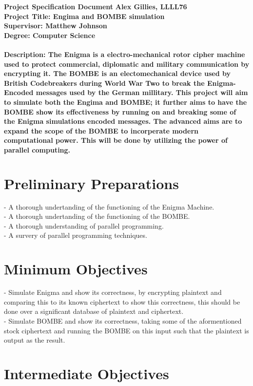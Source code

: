 \documentclass[a4paper, 11pt]{article}
\begin{document}
\noindent
\large\textbf{Project Specification Document} \hfill \textbf{Alex Gillies, LLLL76} \\
\large\textbf{Project Title: Engima and BOMBE simulation} \hfill \\
\large\textbf{Supervisor: Matthew Johnson} \hfill \\
\large\textbf{Degree: Computer Science} \hfill \\
\\
\small\textbf{Description: The Enigma is a electro-mechanical rotor cipher machine used to protect commercial, diplomatic and military communication by encrypting it. The BOMBE is an electomechanical device used by British Codebreakers during World War Two to break the Enigma-Encoded messages used by the German millitary. This project will aim to simulate both the Engima and BOMBE; it further aims to have the BOMBE show its effectiveness by running on and breaking some of the Enigma simulations encoded messages. The advanced aims are to expand the scope of the BOMBE to incorperate modern computational power. This will be done by utilizing the power of parallel computing.} \hfill 


\section*{Preliminary Preparations}

- A thorough undertanding of the functioning of the Enigma Machine.\\
- A thorough undertanding of the functioning of the BOMBE.\\
- A thorough understanding of parallel programming.\\
- A survery of parallel programming techniques.

\section*{Minimum Objectives}

- Simulate Enigma and show its correctness, by encrypting plaintext and comparing this to its known ciphertext to show this correctness, this should be done over a significant database of plaintext and ciphertext.\\
- Simulate BOMBE and show its correctness, taking some of the aformentioned stock ciphertext and running the BOMBE on this input such that the plaintext is output as the result.

\section*{Intermediate Objectives}
\end{document}
